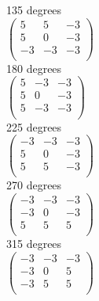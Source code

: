 \documentclass[a4paper]{article}
\begin{document}
135 degrees \\

\begin{math}
   \begin{pmatrix} 
   5 & 5 & -3 \\ 
   5 & 0 & -3 \\
   -3 & -3 & -3 \\ 
   \end{pmatrix}
\end{math}\\

180 degrees \\

\begin{math}
   \begin{pmatrix} 
   5 & -3 & -3 \\ 
   5 & 0 & -3 \\
   5 & -3 & -3 \\ 
   \end{pmatrix}
\end{math}\\

225 degrees \\

\begin{math}
   \begin{pmatrix} 
   -3 & -3 & -3 \\ 
   5 & 0 & -3 \\
   5 & 5 & -3 \\ 
   \end{pmatrix}
\end{math}\\

270 degrees \\

\begin{math}
   \begin{pmatrix} 
   -3 & -3 & -3 \\ 
   -3 & 0 & -3 \\
   5 & 5 & 5 \\ 
   \end{pmatrix}
\end{math}\\

315 degrees \\

\begin{math}
   \begin{pmatrix} 
   -3 & -3 & -3 \\ 
   -3 & 0 & 5 \\
   -3 & 5 & 5 \\ 
   \end{pmatrix}
\end{math}\\
\end{document}
